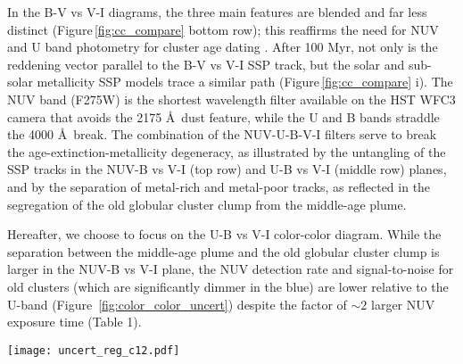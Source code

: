 \documentclass[linenumbers]{aastex63}
\begin{document}
In the B-V vs V-I diagrams, the three main features are blended and far less distinct (Figure\,\ref{fig:cc_compare} bottom row); this reaffirms the need for NUV and U band photometry for cluster age dating \citep{smith_young_2007}.  
After 100 Myr, not only is the reddening vector parallel to the B-V vs V-I SSP track, but the solar and sub-solar metallicity SSP models trace a similar path (Figure\,\ref{fig:cc_compare} i).  The NUV band (F275W) is the shortest wavelength filter available on the HST WFC3 camera that avoids the 2175 \AA\ dust feature, while the U and B bands straddle the 4000 \AA\ break.  The combination of the NUV-U-B-V-I filters serve to break the age-extinction-metallicity degeneracy, as illustrated by the untangling of the SSP tracks in the NUV-B vs V-I (top row) and U-B vs V-I (middle row) planes, and by the separation of metal-rich and metal-poor tracks, as reflected in the segregation of the old globular cluster clump from the middle-age plume. 

Hereafter, we choose to focus on the U-B vs V-I color-color diagram.  While the separation between the middle-age plume and the old globular cluster clump is larger in the NUV-B vs V-I plane, the NUV detection rate and signal-to-noise for old clusters (which are significantly dimmer in the blue) are lower relative to the U-band (Figure~\ref{fig:color_color_uncert}) despite the factor of $\sim2$ larger NUV exposure time (Table 1).

\begin{figure*} 
\texttt{[image: uncert\_reg\_c12.pdf]}
 \caption{Mean color uncertainties for the NUV-B vs V-I (top row) and U-B vs V-I (bottom row) diagrams. We present class 1+2 clusters for ML (left two panels) and human classifications (right two panels) separately. %
 The maps show the mean uncertainty in each bin, and only bins with at least 5 clusters are displayed. }
 \label{fig:color_color_uncert}
\end{figure*}

\end{document}
